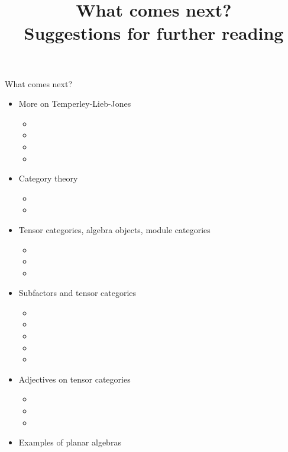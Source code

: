 \documentclass[12pt]{amsart}
\title{What comes next? \\ Suggestions for further reading}
\begin{document}
\maketitle

What comes next?



\begin{itemize}
\item More on Temperley-Lieb-Jones
  \begin{itemize}
  \item {}
  \item {}
  \item {}
  \item {}
  \end{itemize}
\item Category theory
  \begin{itemize}
  \item {}
  \item {}
  \end{itemize}
\item Tensor categories, algebra objects, module categories
	\begin{itemize}	
	\item {}
	\item {}
	\item {}
	\end{itemize}
\item Subfactors and tensor categories
  \begin{itemize}
  \item {}
  \item {}
  \item {}
  \item {}
  \item {}
  \end{itemize}
\item Adjectives on tensor categories
  \begin{itemize}
  \item {}
  \item {}
  \item {}
  \end{itemize}
\item Examples of planar algebras
  \begin{itemize}

\end{itemize}
\end{itemize}
\end{document}
